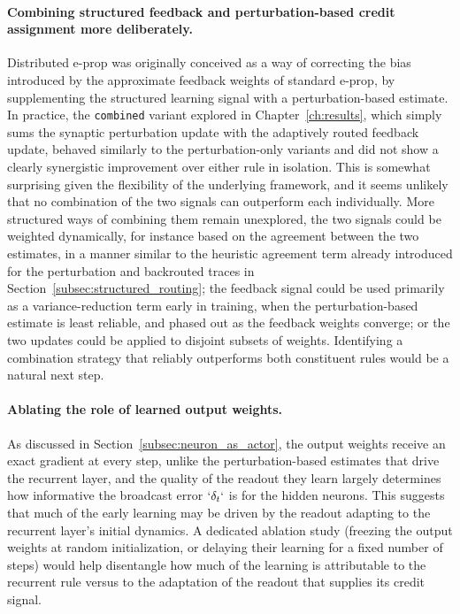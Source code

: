 \paragraph{Combining structured feedback and perturbation-based credit
assignment more deliberately.} Distributed e-prop was originally
conceived as a way of correcting the bias introduced by the approximate
feedback weights of standard e-prop, by supplementing the
structured learning signal with a perturbation-based estimate. In
practice, the \texttt{combined} variant explored in
Chapter~\ref{ch:results}, which simply sums the synaptic
perturbation update with the adaptively routed feedback update, behaved
similarly to the perturbation-only variants and did not show a clearly
synergistic improvement over either rule in isolation. This is somewhat
surprising given the flexibility of the underlying framework, and it
seems unlikely that no combination of the two signals can outperform
each individually. More structured ways of combining them remain
unexplored, the two signals could be weighted dynamically, 
for instance based on the agreement between the two estimates, 
in a manner similar to the heuristic agreement 
term already introduced for the perturbation and
backrouted traces in Section~\ref{subsec:structured_routing}; the feedback
signal could be used primarily as a variance-reduction term early in
training, when the perturbation-based estimate is least reliable, and
phased out as the feedback weights converge; or the two updates could be
applied to disjoint subsets of weights. 
Identifying a combination strategy that reliably outperforms
both constituent rules would be a natural next step.

\paragraph{Ablating the role of learned output weights.} As discussed in
Section~\ref{subsec:neuron_as_actor}, the output weights receive an exact
gradient at every step, unlike the perturbation-based estimates that drive the
recurrent layer, and the quality of the readout they learn largely determines
how informative the broadcast error $`\delta_t`$ is for the hidden neurons.
This suggests that much of the early learning may be driven by the readout
adapting to the recurrent layer's initial dynamics. A dedicated ablation
study (freezing the output weights at random initialization, or delaying
their learning for a fixed number of steps) would help disentangle how much
of the learning is attributable to the recurrent rule versus to the
adaptation of the readout that supplies its credit signal.

